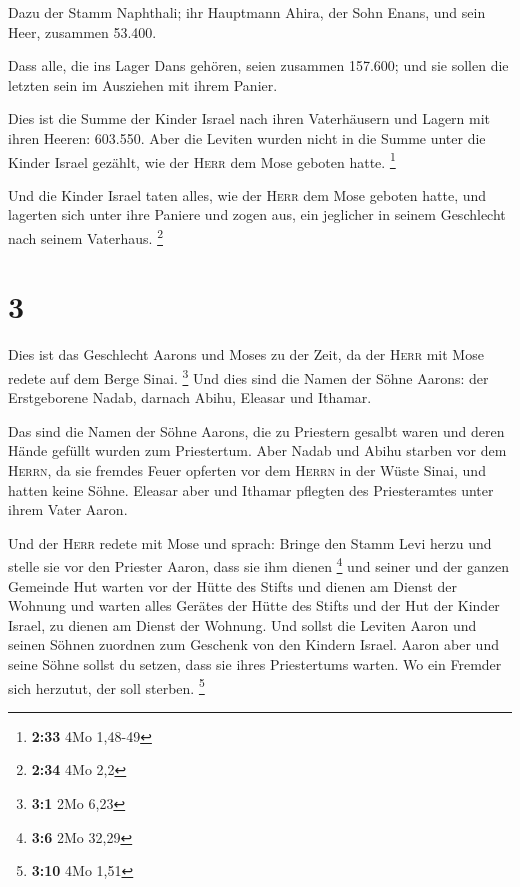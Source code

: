  Dazu der Stamm Naphthali; ihr Hauptmann Ahira, der Sohn
Enans,  und sein Heer, zusammen 53.400.

 Dass alle, die ins Lager Dans gehören, seien zusammen
157.600; und sie sollen die letzten sein im Ausziehen mit ihrem Panier.

 Dies ist die Summe der Kinder Israel nach ihren
Vaterhäusern und Lagern mit ihren Heeren: 603.550.  Aber
die Leviten wurden nicht in die Summe unter die Kinder Israel gezählt,
wie der \textsc{Herr} dem Mose geboten hatte. \footnote{\textbf{2:33}
  4Mo 1,48-49}

 Und die Kinder Israel taten alles, wie der \textsc{Herr}
dem Mose geboten hatte, und lagerten sich unter ihre Paniere und zogen
aus, ein jeglicher in seinem Geschlecht nach seinem Vaterhaus.
\footnote{\textbf{2:34} 4Mo 2,2}

\hypertarget{section-1}{%
\section{3}\label{section-1}}

 Dies ist das Geschlecht Aarons und Moses zu der Zeit, da
der \textsc{Herr} mit Mose redete auf dem Berge Sinai. \footnote{\textbf{3:1}
  2Mo 6,23}  Und dies sind die Namen der Söhne Aarons: der
Erstgeborene Nadab, darnach Abihu, Eleasar und Ithamar.

 Das sind die Namen der Söhne Aarons, die zu Priestern
gesalbt waren und deren Hände gefüllt wurden zum Priestertum.
 Aber Nadab und Abihu starben vor dem \textsc{Herrn}, da
sie fremdes Feuer opferten vor dem \textsc{Herrn} in der Wüste Sinai,
und hatten keine Söhne. Eleasar aber und Ithamar pflegten des
Priesteramtes unter ihrem Vater Aaron.

 Und der \textsc{Herr} redete mit Mose und sprach:
 Bringe den Stamm Levi herzu und stelle sie vor den
Priester Aaron, dass sie ihm dienen \footnote{\textbf{3:6} 2Mo 32,29}
 und seiner und der ganzen Gemeinde Hut warten vor der
Hütte des Stifts und dienen am Dienst der Wohnung  und
warten alles Gerätes der Hütte des Stifts und der Hut der Kinder Israel,
zu dienen am Dienst der Wohnung.  Und sollst die Leviten
Aaron und seinen Söhnen zuordnen zum Geschenk von den Kindern Israel.
 Aaron aber und seine Söhne sollst du setzen, dass sie
ihres Priestertums warten. Wo ein Fremder sich herzutut, der soll
sterben. \footnote{\textbf{3:10} 4Mo 1,51}

